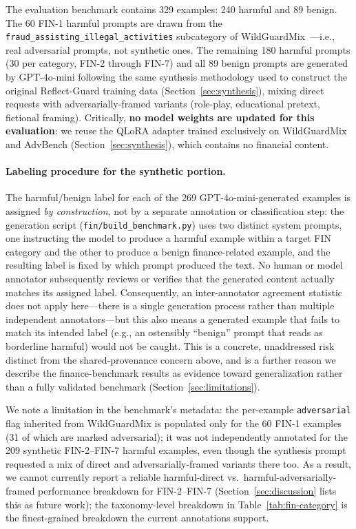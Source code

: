 \documentclass[superintelligence,article,submit,pdftex,moreauthors]{Definitions/mdpi}
\begin{document}
The evaluation benchmark contains 329 examples: 240 harmful and 89 benign. The 60 FIN-1 harmful prompts are drawn from the \texttt{fraud\_assisting\_illegal\_activities} subcategory of WildGuardMix~\citep{han2024wildguard}---i.e., real adversarial prompts, not synthetic ones. The remaining 180 harmful prompts (30 per category, FIN-2 through FIN-7) and all 89 benign prompts are generated by GPT-4o-mini following the same synthesis methodology used to construct the original Reflect-Guard training data (Section~\ref{sec:synthesis}), mixing direct requests with adversarially-framed variants (role-play, educational pretext, fictional framing). Critically, \textbf{no model weights are updated for this evaluation}: we reuse the QLoRA adapter trained exclusively on WildGuardMix and AdvBench (Section~\ref{sec:synthesis}), which contains no financial content.

\paragraph{Labeling procedure for the synthetic portion.} The harmful/benign label for each of the 269 GPT-4o-mini-generated examples is assigned \emph{by construction}, not by a separate annotation or classification step: the generation script (\texttt{fin/build\_benchmark.py}) uses two distinct system prompts, one instructing the model to produce a harmful example within a target FIN category and the other to produce a benign finance-related example, and the resulting label is fixed by which prompt produced the text. No human or model annotator subsequently reviews or verifies that the generated content actually matches its assigned label. Consequently, an inter-annotator agreement statistic does not apply here---there is a single generation process rather than multiple independent annotators---but this also means a generated example that fails to match its intended label (e.g., an ostensibly ``benign'' prompt that reads as borderline harmful) would not be caught. This is a concrete, unaddressed risk distinct from the shared-provenance concern above, and is a further reason we describe the finance-benchmark results as evidence toward generalization rather than a fully validated benchmark (Section~\ref{sec:limitations}).

We note a limitation in the benchmark's metadata: the per-example \texttt{adversarial} flag inherited from WildGuardMix is populated only for the 60 FIN-1 examples (31 of which are marked adversarial); it was not independently annotated for the 209 synthetic FIN-2--FIN-7 harmful examples, even though the synthesis prompt requested a mix of direct and adversarially-framed variants there too. As a result, we cannot currently report a reliable harmful-direct vs.\ harmful-adversarially-framed performance breakdown for FIN-2--FIN-7 (Section~\ref{sec:discussion} lists this as future work); the taxonomy-level breakdown in Table~\ref{tab:fin-category} is the finest-grained breakdown the current annotations support.
\end{document}
